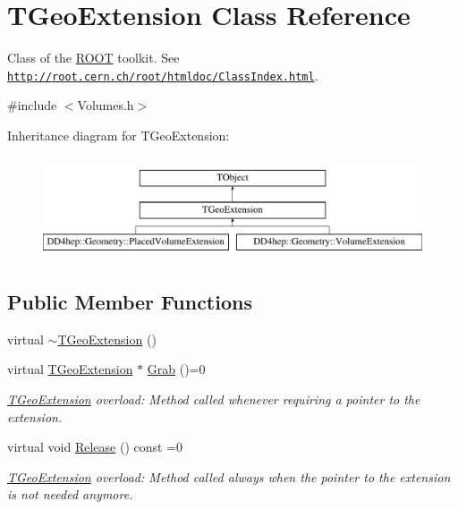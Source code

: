 \hypertarget{class_t_geo_extension}{}\section{T\+Geo\+Extension Class Reference}
\label{class_t_geo_extension}


Class of the \hyperlink{namespace_r_o_o_t}{R\+O\+OT} toolkit. See \href{http://root.cern.ch/root/htmldoc/ClassIndex.html}{\tt http\+://root.\+cern.\+ch/root/htmldoc/\+Class\+Index.\+html}.  




{\ttfamily \#include $<$Volumes.\+h$>$}

Inheritance diagram for T\+Geo\+Extension\+:\begin{figure}[H]
\begin{center}
\leavevmode
\includegraphics[height=3.000000cm]{class_t_geo_extension}
\end{center}
\end{figure}
\subsection*{Public Member Functions}
\begin{DoxyCompactItemize}
\item 
virtual \hyperlink{class_t_geo_extension_a07855c18b6678a4f6f4f125b85727fa1}{$\sim$\+T\+Geo\+Extension} ()
\item 
virtual \hyperlink{class_t_geo_extension}{T\+Geo\+Extension} $\ast$ \hyperlink{class_t_geo_extension_addd8a323d93527519b94e2db3acbf9d5}{Grab} ()=0
\begin{DoxyCompactList}\small\item\em \hyperlink{class_t_geo_extension}{T\+Geo\+Extension} overload\+: Method called whenever requiring a pointer to the extension. \end{DoxyCompactList}\item 
virtual void \hyperlink{class_t_geo_extension_af3013d9059744f1d7f9f9037a57bf3da}{Release} () const =0
\begin{DoxyCompactList}\small\item\em \hyperlink{class_t_geo_extension}{T\+Geo\+Extension} overload\+: Method called always when the pointer to the extension is not needed anymore. \end{DoxyCompactList}\end{DoxyCompactItemize}



